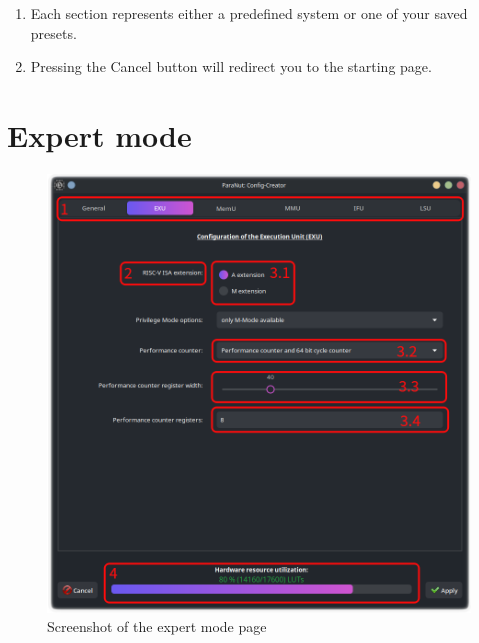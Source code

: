 \begin{enumerate}
	\item Each section represents either a predefined system or one of your saved presets. 
	\item Pressing the \glqq Cancel\grqq{}  button will redirect you to the starting page.

\end{enumerate}
\newpage
\section{Expert mode}

\begin{figure}[!h]
    \noindent \begin{centering}
        \includegraphics[width=15cm]{images/edit_page}
        \par\end{centering}
    \caption{Screenshot of the expert mode page}
\end{figure}

